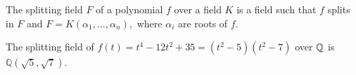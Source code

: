 \begin{definition}
    The splitting field $F$ of a polynomial $f$ over a field $K$ is a field such that $f$ splits in $F$ and $F = K(\alpha_1, \ldots, \alpha_n), $ where $\alpha_i$ are roots of $f$. 
\end{definition}


\begin{example}
	 The splitting field of \(f(t) = t^4 - 12t^2 + 35 = (t^2 - 5) (t ^ 2 - 7)\) over $\mathbb Q$ is \(\mathbb{Q}(\sqrt{5},\sqrt{7})\).
\end{example}

